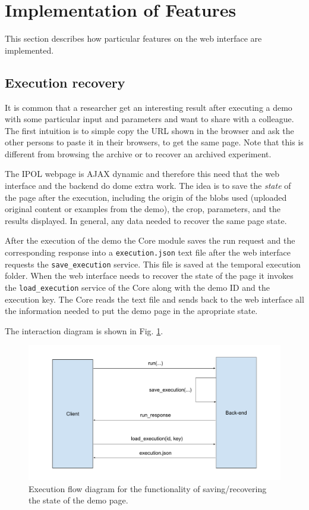 \section{Implementation of Features}
This section describes how particular features on the web interface are implemented.

%
\subsection{Execution recovery}
It is common that a researcher get an interesting result after executing a demo with some particular input and parameters and want to share with a colleague. The first intuition is to simple copy the URL shown in the browser and ask the other persons to paste it in their browsers, to get the same page. Note that this is different from browsing the archive or to recover an archived experiment.

The IPOL webpage is AJAX dynamic and therefore this need that the web interface and the backend do dome extra work. The idea is to save the \emph{state} of the page after the execution, including the origin of the blobs used (uploaded original content or examples from the demo), the crop, parameters, and the results displayed. In general, any data needed to recover the same page state.

After the execution of the demo the Core module saves the run request and the corresponding response into a {\tt execution.json} text file after the web interface requests the {\tt save\_execution} service. This file is saved at the temporal execution folder.
%
When the web interface needs to recover the state of the page it invokes the {\tt load\_execution} service of the Core along with the demo ID and the execution key. The Core reads the text file and sends back to the web interface all the information needed to put the demo page in the apropriate state.

The interaction diagram is shown in Fig. \ref{fig:execution_flow}.

\begin{figure}[h]
	\centering
	\includegraphics[width=\textwidth]{images/execution_flow}
	\caption{Execution flow diagram for the functionality of saving/recovering the state of the demo page.} 
	\label{fig:execution_flow}
\end{figure}
